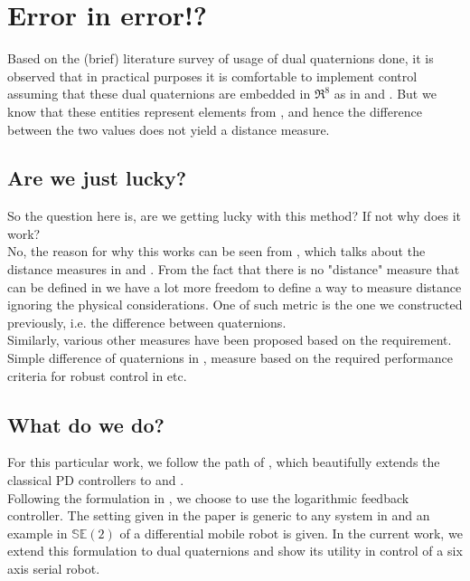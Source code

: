 \documentclass[a4paper,12pt]{article}
\begin{document}
\section{Error in error!?}
Based on the (brief) literature survey of usage of dual quaternions done, it is observed that in practical purposes it is comfortable to implement control assuming that these dual quaternions are embedded in $\Re^8$ as in \cite{pham2010position} and \cite{adorno2010dual}. But we know that these entities represent elements from \SE, and hence the difference between the two values does not yield a distance measure.

\subsection{Are we just lucky?}
So the question here is, are we getting lucky with this method? If not why does it work?\\
No, the reason for why this works can be seen from \cite{park1995distance}, which talks about the distance measures in \SO and \SE. From the fact that there is no "distance" measure that can be defined in \SE we have a lot more freedom to define a way to measure distance ignoring the physical considerations. One of such metric is the one we constructed previously, i.e. the difference between quaternions.\\
Similarly, various other measures have been proposed based on the requirement. Simple difference of quaternions in \cite{adorno2010dual}, measure based on the required performance criteria for robust control in \cite{figueredo2013robust} etc.

\subsection{What do we do?}
For this particular work, we follow the path of \cite{bullo1995proportional}, which beautifully extends the classical PD controllers to \SO and \SE.\\
Following the formulation in \cite{bullo1995proportional}, we choose to use the logarithmic feedback controller. The setting given in the paper is generic to any system in \SE and an example in $\ensuremath{\mathbb{SE}(2)}\xspace$ of a differential mobile robot is given. In the current work, we extend this formulation to dual quaternions and show its utility in control of a six axis serial robot.
\end{document}
